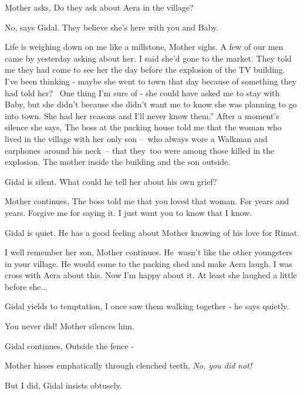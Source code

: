 \documentclass[letterpaper]{article}
\begin{document}
Mother asks, {\textquotedbl}Do they ask about Aera in the village?{\textquotedbl} 

{\textquotedbl}No,{\textquotedbl} says Gidal. {\textquotedbl}They believe she's here with you and Baby.{\textquotedbl}

{\textquotedbl}Life is weighing down on me like a millstone,{\textquotedbl} Mother sighs. {\textquotedbl}A few of our
men came by yesterday asking about her. I said she'd gone to the market. They told me they had come to see her the day
before the explosion of the TV building. I've been thinking - maybe she went to town that day because of something they
had told her? ~One thing I'm sure of - she could have asked me to stay with Baby, but she didn't because she didn't
want me to know she was planning to go into town. She had her reasons and I'll never know them.'' After a moment's
silence she says, {\textquotedbl}The boss at the packing house told me that the woman who lived in the village with her
only son --\ who always wore a Walkman and earphones\ around his neck\ {}-- that they~too were among those killed in
the explosion. The mother inside the building and the son outside.{\textquotedbl} 

Gidal is silent. What could he tell her about his own grief? ~

Mother continues, {\textquotedbl}The boss told me that you loved that woman. For years and years. Forgive me for saying
it. I just want you to know that I know.{\textquotedbl} 

Gidal is quiet. He has a good feeling about Mother knowing of his love for Rimat. 

{\textquotedbl}I well remember her son,{\textquotedbl} Mother continues. {\textquotedbl}He~wasn't like the other
youngsters in your village. He would come to the packing shed and make Aera laugh. I was cross with Aera about this.
Now I'm happy about it. At least she laughed a little before she... {\textquotedbl} 

Gidal yields to temptation, {\textquotedbl}I once saw them walking together -{\textquotedbl} he says quietly.

{\textquotedbl}You never did!{\textquotedbl} Mother silences him.

Gidal continues, {\textquotedbl}Outside the fence -{\textquotedbl} 

Mother hisses emphatically through clenched teeth, {\textquotedbl}\textit{No, you did not!}{\textquotedbl} 

{\textquotedbl}But I did,{\textquotedbl} Gidal insists obtusely.\ 
\end{document}
